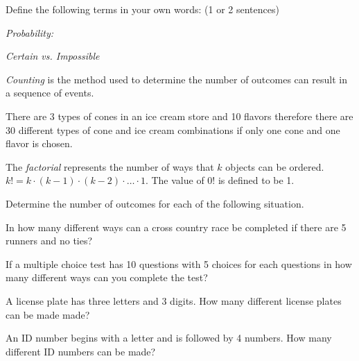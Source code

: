 \begin{problem}
  \item Define the following terms in your own words: (1 or 2 sentences) 

    \begin{subproblem}
      \item \textit{Probability:}

        \vfill

      \item \textit{Certain vs. Impossible}

        \vfill

    \end{subproblem}


    \begin{definition}
      \textit{Counting} is the method used to determine the number of
      outcomes can result in a sequence of events.  
    \end{definition}

    \begin{example}
      There are 3 types of cones in an ice cream store and 10 flavors
      therefore there are 30 different types of cone and ice cream
      combinations if only one cone and one flavor is chosen.
    \end{example}

    \begin{definition}
      The \textit{factorial} represents the number of ways that $k$
       objects can be ordered. $k! = k \cdot (k-1) \cdot (k-2) \cdot
       \ldots \cdot 1$.  The value of  0! is defined to be 1.
    \end{definition}


        \clearpage

    \item Determine the number of outcomes for each of the following
      situation.

      \begin{subproblem}
      \item In how many different ways can a cross country race be
        completed if there are 5 runners and no ties?

        \vfill

      \item If a multiple choice test has 10 questions with 5 choices
        for each questions in how many different ways can you complete
        the test?

        \vfill

      \item A license plate has three letters and 3 digits. How many
        different license plates can be made made?

        \vfill

      \item An ID number begins with a letter and is followed by 4
        numbers. How many different ID numbers can be made?

        \vfill

  \end{subproblem}


\end{problem}



